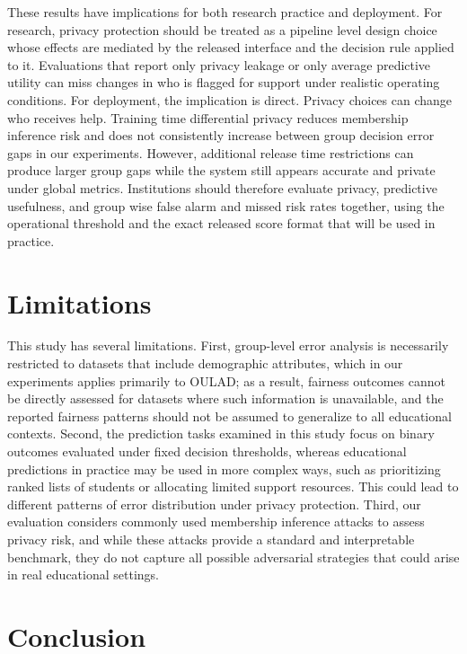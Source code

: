\documentclass{edm_article}
\begin{document}
These results have implications for both research practice and deployment. For research, privacy protection should be treated as a pipeline level design choice whose effects are mediated by the released interface and the decision rule applied to it. Evaluations that report only privacy leakage or only average predictive utility can miss changes in who is flagged for support under realistic operating conditions. For deployment, the implication is direct. Privacy choices can change who receives help. Training time differential privacy reduces membership inference risk and does not consistently increase between group decision error gaps in our experiments. However, additional release time restrictions can produce larger group gaps while the system still appears accurate and private under global metrics. Institutions should therefore evaluate privacy, predictive usefulness, and group wise false alarm and missed risk rates together, using the operational threshold and the exact released score format that will be used in practice.

\section{Limitations}
This study has several limitations. First, group-level error analysis is necessarily restricted to datasets that include demographic attributes, which in our experiments applies primarily to OULAD; as a result, fairness outcomes cannot be directly assessed for datasets where such information is unavailable, and the reported fairness patterns should not be assumed to generalize to all educational contexts. Second, the prediction tasks examined in this study focus on binary outcomes evaluated under fixed decision thresholds, whereas educational predictions in practice may be used in more complex ways, such as prioritizing ranked lists of students or allocating limited support resources. This could lead to different patterns of error distribution under privacy protection. Third, our evaluation considers commonly used membership inference attacks to assess privacy risk, and while these attacks provide a standard and interpretable benchmark, they do not capture all possible adversarial strategies that could arise in real educational settings. 

\section{Conclusion}
\end{document}
